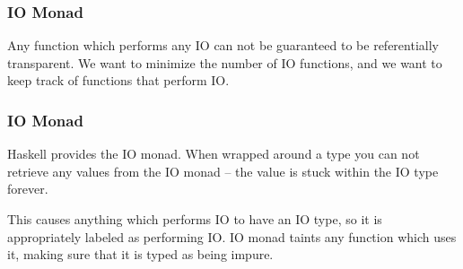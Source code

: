 \documentclass[presentation.tex]{subfiles}
\begin{document}
\begin{frame}[fragile]
  \frametitle{IO Monad}

  Any function which performs any IO can not be guaranteed to be
  referentially transparent. We want to minimize the number of IO
  functions, and we want to keep track of functions that perform IO.
\end{frame}

\begin{frame}[fragile]
  \frametitle{IO Monad}

  Haskell provides the IO monad. When wrapped around a type you can
  not retrieve any values from the IO monad -- the value is stuck
  within the IO type forever.

  This causes anything which performs IO to have an IO type, so it is
  appropriately labeled as performing IO. IO monad taints any function
  which uses it, making sure that it is typed as being impure.
\end{frame}
\end{document}

